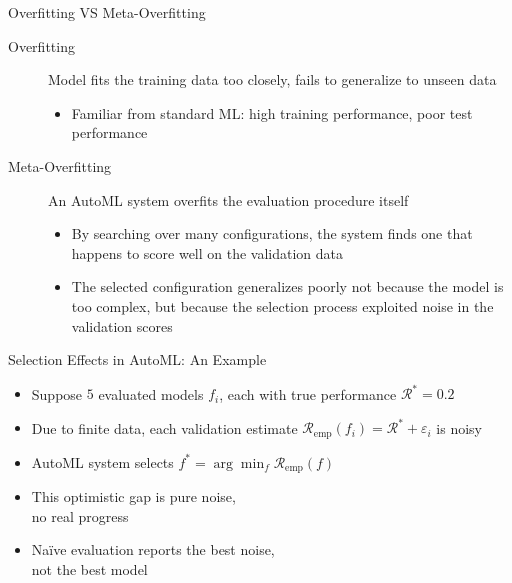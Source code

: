 \documentclass[main]{subfiles}
\begin{document}
\begin{frame}{Overfitting VS Meta-Overfitting}
    \begin{description}
        \item[Overfitting] Model fits the training data too closely, fails to generalize to unseen data
        \begin{itemize}
            \item Familiar from standard ML: high training performance, poor test performance
        \end{itemize}
        \item[Meta-Overfitting] An AutoML system overfits the evaluation procedure itself
        \begin{itemize}
            \item By searching over many configurations, the system finds one that happens to score well on the validation data
            \item The selected configuration generalizes poorly not because the model is too complex, but because the selection process exploited noise in the validation scores
        \end{itemize}    
    \end{description}
\end{frame}

\begin{frame}{Selection Effects in AutoML: An Example}
    \begin{minipage}{.58\textwidth}
        \begin{itemize}
            \item Suppose $5$ evaluated models $f_i$, each with true performance $\mathcal{R}^\ast = 0.2$
            \item Due to finite data, each validation estimate $\mathcal{R}_\text{emp}(f_i) = \mathcal{R}^\ast + \varepsilon_i$ is noisy
            \item AutoML system selects $f^\ast = \arg\min_f \mathcal{R}_\text{emp}(f)$
            \item This optimistic gap is pure noise,\\ no real progress
            \item Na\"ive evaluation reports the best noise,\\ not the best model
        \end{itemize}
    \end{minipage}
    \hfill
    \begin{minipage}{.4\textwidth}
    
    \end{minipage}
\end{frame}
\end{document}
